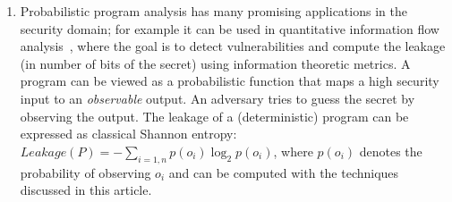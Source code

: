 \begin{enumerate}
\item Probabilistic program analysis has many promising applications in the security domain; for example it can be used in quantitative information flow analysis~\cite{FSE16}, where the goal is to detect vulnerabilities and compute the leakage (in number of bits of the secret) using information theoretic metrics. A program can be viewed as a probabilistic function that maps a high security input to an {\em observable} output. An adversary tries to guess the secret by observing the output.  The leakage of a (deterministic) program can be expressed as classical Shannon entropy: $Leakage(P)=-\sum_{i=1,n} p(o_i) \log_2 p(o_i)$, where $p(o_i)$ denotes the probability of observing $o_i$ and can be computed with the techniques discussed in this article.
\end{enumerate}
